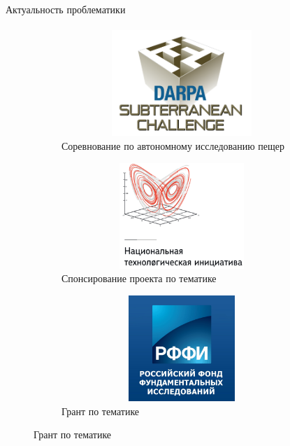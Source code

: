 \documentclass[aspectratio=169,xcolor=table]{beamer}
\begin{document}
\begin{frame}[t]{Актуальность проблематики}
\framesubtitle{}
\begin{figure}[H]
    \begin{subfigure}[t]{0.32\textwidth}
        \centering\includegraphics[height=4cm,width=1\textwidth,keepaspectratio]{Darpa_SubT.png}
        \caption*{Соревнование по автономному исследованию пещер}
        \label{fig:Darpa_SubT.png}
    \end{subfigure}
    \begin{subfigure}[t]{0.32\textwidth}
        \centering\includegraphics[height=4cm,width=1\textwidth,keepaspectratio]{NTI.png}
        \caption*{Спонсирование проекта по тематике}
        \label{fig:NTI.png}
    \end{subfigure}
    \begin{subfigure}[t]{0.32\textwidth}
        \centering\includegraphics[height=4cm,width=1\textwidth,keepaspectratio]{rffi.jpeg}
        \caption*{Грант по тематике}
        \label{fig:rffi.jpeg}
    \end{subfigure}
\end{figure}
\end{frame}
\end{document}

